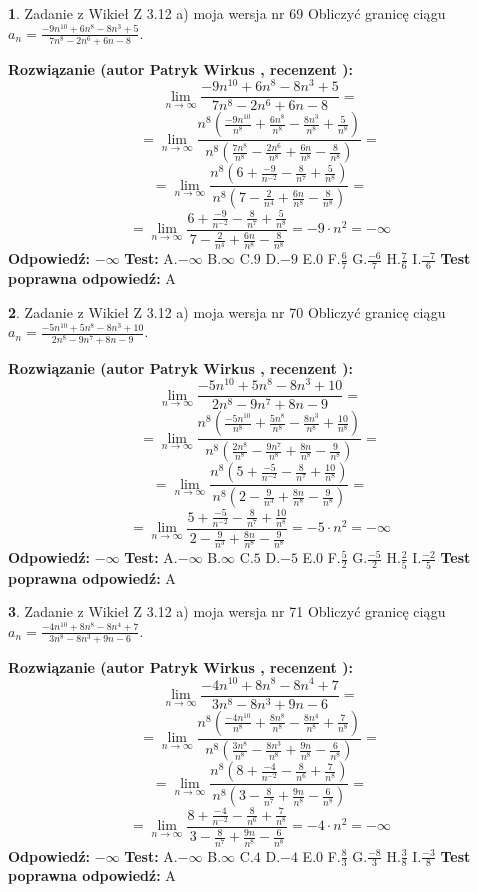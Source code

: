 \documentclass[12pt, a4paper]{article}
\theoremstyle{definition} %
\newtheorem{zad}{}
\newcommand{\zadStart}[1]{\begin{zad}#1\newline}
\newcommand{\zadStop}{\end{zad}}
\newcommand{\rozwStart}[2]{\noindent \textbf{Rozwiązanie (autor #1 , recenzent #2): }\newline}
\newcommand{\rozwStop}{\newline}
\newcommand{\odpStart}{\noindent \textbf{Odpowiedź:}\newline}
\newcommand{\odpStop}{\newline}
\newcommand{\testStart}{\noindent \textbf{Test:}\newline}
\newcommand{\testStop}{\newline}
\newcommand{\kluczStart}{\noindent \textbf{Test poprawna odpowiedź:}\newline}
\newcommand{\kluczStop}{\newline}
\begin{document}
\zadStart{Zadanie z Wikieł Z 3.12 a) moja wersja nr 69}
Obliczyć granicę ciągu $a_{n}=\frac{-9n^{10}+6n^{8}-8n^{3}+5}{7n^{8}-2n^{6}+6n-8}$.
\zadStop
\rozwStart{Patryk Wirkus}{}
$$\lim\limits_{n\to\infty}\frac{-9n^{10}+6n^{8}-8n^{3}+5}{7n^{8}-2n^{6}+6n-8}=$$
$$=\lim\limits_{n\to\infty}\frac{n^{8}\left(\frac{-9n^{10}}{n^{8}}+\frac{6n^{8}}{n^{8}}-\frac{8n^{3}}{n^{8}}+\frac{5}{n^{8}}\right)}{n^{8}\left(\frac{7n^{8}}{n^{8}}-\frac{2n^{6}}{n^{8}}+\frac{6n}{n^{8}}-\frac{8}{n^{8}}\right)}=$$
$$=\lim\limits_{n\to\infty}\frac{n^{8}\left(6+\frac{-9}{n^{-2}}-\frac{8}{n^{7}}+\frac{5}{n^{8}}\right)}
{n^{8}\left(7-\frac{2}{n^{4}}+\frac{6n}{n^{8}}-\frac{8}{n^{8}}\right)}=$$
$$=\lim\limits_{n\to\infty}\frac{6+\frac{-9}{n^{-2}}-\frac{8}{n^{7}}+\frac{5}{n^{8}}}{7-\frac{2}{n^{4}}+\frac{6n}{n^{8}}-\frac{8}{n^{8}}}=-9\cdot n^{2} = -\infty$$
\rozwStop
\odpStart
$-\infty$
\odpStop
\testStart
A.$-\infty$
B.$\infty$
C.$9$
D.$-9$
E.$0$
F.$\frac{6}{7}$
G.$\frac{-6}{7}$
H.$\frac{7}{6}$
I.$\frac{-7}{6}$
\testStop
\kluczStart
A
\kluczStop



\zadStart{Zadanie z Wikieł Z 3.12 a) moja wersja nr 70}
Obliczyć granicę ciągu $a_{n}=\frac{-5n^{10}+5n^{8}-8n^{3}+10}{2n^{8}-9n^{7}+8n-9}$.
\zadStop
\rozwStart{Patryk Wirkus}{}
$$\lim\limits_{n\to\infty}\frac{-5n^{10}+5n^{8}-8n^{3}+10}{2n^{8}-9n^{7}+8n-9}=$$
$$=\lim\limits_{n\to\infty}\frac{n^{8}\left(\frac{-5n^{10}}{n^{8}}+\frac{5n^{8}}{n^{8}}-\frac{8n^{3}}{n^{8}}+\frac{10}{n^{8}}\right)}{n^{8}\left(\frac{2n^{8}}{n^{8}}-\frac{9n^{7}}{n^{8}}+\frac{8n}{n^{8}}-\frac{9}{n^{8}}\right)}=$$
$$=\lim\limits_{n\to\infty}\frac{n^{8}\left(5+\frac{-5}{n^{-2}}-\frac{8}{n^{7}}+\frac{10}{n^{8}}\right)}
{n^{8}\left(2-\frac{9}{n^{3}}+\frac{8n}{n^{8}}-\frac{9}{n^{8}}\right)}=$$
$$=\lim\limits_{n\to\infty}\frac{5+\frac{-5}{n^{-2}}-\frac{8}{n^{7}}+\frac{10}{n^{8}}}{2-\frac{9}{n^{3}}+\frac{8n}{n^{8}}-\frac{9}{n^{8}}}=-5\cdot n^{2} = -\infty$$
\rozwStop
\odpStart
$-\infty$
\odpStop
\testStart
A.$-\infty$
B.$\infty$
C.$5$
D.$-5$
E.$0$
F.$\frac{5}{2}$
G.$\frac{-5}{2}$
H.$\frac{2}{5}$
I.$\frac{-2}{5}$
\testStop
\kluczStart
A
\kluczStop



\zadStart{Zadanie z Wikieł Z 3.12 a) moja wersja nr 71}
Obliczyć granicę ciągu $a_{n}=\frac{-4n^{10}+8n^{8}-8n^{4}+7}{3n^{8}-8n^{3}+9n-6}$.
\zadStop
\rozwStart{Patryk Wirkus}{}
$$\lim\limits_{n\to\infty}\frac{-4n^{10}+8n^{8}-8n^{4}+7}{3n^{8}-8n^{3}+9n-6}=$$
$$=\lim\limits_{n\to\infty}\frac{n^{8}\left(\frac{-4n^{10}}{n^{8}}+\frac{8n^{8}}{n^{8}}-\frac{8n^{4}}{n^{8}}+\frac{7}{n^{8}}\right)}{n^{8}\left(\frac{3n^{8}}{n^{8}}-\frac{8n^{3}}{n^{8}}+\frac{9n}{n^{8}}-\frac{6}{n^{8}}\right)}=$$
$$=\lim\limits_{n\to\infty}\frac{n^{8}\left(8+\frac{-4}{n^{-2}}-\frac{8}{n^{6}}+\frac{7}{n^{8}}\right)}
{n^{8}\left(3-\frac{8}{n^{7}}+\frac{9n}{n^{8}}-\frac{6}{n^{8}}\right)}=$$
$$=\lim\limits_{n\to\infty}\frac{8+\frac{-4}{n^{-2}}-\frac{8}{n^{6}}+\frac{7}{n^{8}}}{3-\frac{8}{n^{7}}+\frac{9n}{n^{8}}-\frac{6}{n^{8}}}=-4\cdot n^{2} = -\infty$$
\rozwStop
\odpStart
$-\infty$
\odpStop
\testStart
A.$-\infty$
B.$\infty$
C.$4$
D.$-4$
E.$0$
F.$\frac{8}{3}$
G.$\frac{-8}{3}$
H.$\frac{3}{8}$
I.$\frac{-3}{8}$
\testStop
\kluczStart
A
\kluczStop
\end{document}
